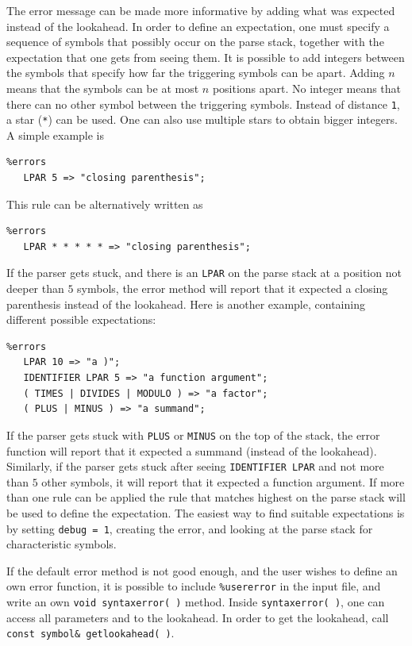 \documentclass{article}
\begin{document}
The error message can be made more informative by 
adding what was expected instead of the lookahead.
In order to define an expectation, 
one must specify a sequence of symbols that possibly
occur on the parse stack, together with the expectation 
that one gets from seeing them. 
It is possible to add integers between the symbols 
that specify how far the triggering symbols can be apart. 
Adding $ n $ 
means that the symbols can be at most $ n $ positions apart.
No integer means that there can no other symbol between
the triggering symbols.
Instead of distance \verb+1+, a star
(\verb+*+) can be used. One can also use multiple stars
to obtain bigger integers. 
A simple example is
\begin{verbatim}
%errors
   LPAR 5 => "closing parenthesis"; \end{verbatim}
This rule can be alternatively written as
\begin{verbatim}
%errors
   LPAR * * * * * => "closing parenthesis"; \end{verbatim}
If the parser gets stuck, and there is an \verb+LPAR+ 
on the parse stack at a position not deeper than $ 5 $ symbols,
the error method will report that it expected
a closing parenthesis instead of the lookahead.
Here is another example, containing different possible
expectations: 
\begin{verbatim}
%errors
   LPAR 10 => "a )";
   IDENTIFIER LPAR 5 => "a function argument";
   ( TIMES | DIVIDES | MODULO ) => "a factor";
   ( PLUS | MINUS ) => "a summand"; \end{verbatim}
If the parser gets stuck with \verb+PLUS+ or \verb+MINUS+ on
the top of the stack, the error function will report that it
expected a summand (instead of the lookahead).
Similarly, if the parser gets stuck after seeing \verb+IDENTIFIER LPAR+ 
and not more than $ 5 $ other symbols, it will report that it
expected a function argument.
If more than one rule can be applied the rule that matches
highest on the parse stack will be used to define the expectation. 
The easiest way to find suitable expectations is by
setting \verb+debug = 1+, creating the error, and looking
at the parse stack for characteristic symbols.

If the default error method is not good enough, and the user wishes 
to define an own error function, 
it is possible to include \verb+%usererror+ in the input file, 
and write an own 
\verb+void syntaxerror( )+ method. 
Inside \verb+syntaxerror( )+, one can access
all parameters and to the lookahead. 
In order to get the lookahead, call \verb+const symbol& getlookahead( )+. 
\end{document}
